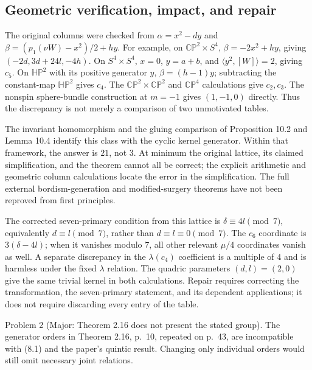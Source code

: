 \documentclass[10pt]{article}
\begin{document}
\subsection*{Geometric verification, impact, and repair}
The original columns were checked from \(\alpha=x^2-dy\) and \(\beta=(p_1(\nu W)-x^2)/2+hy\). For example, on \(\mathbb {CP}^2\times S^4\), \(\beta=-2x^2+hy\), giving \((-2d,3d+24l,-4h)\). On \(S^4\times S^4\), \(x=0\), \(y=a+b\), and \(\langle y^2,[W]\rangle=2\), giving \(c_5\). On \(\mathbb {HP}^2\) with its positive generator \(y\), \(\beta=(h-1)y\); subtracting the constant-map \(\mathbb {HP}^2\) gives \(c_4\). The \(\mathbb {CP}^2\times\mathbb {CP}^2\) and \(\mathbb {CP}^4\) calculations give \(c_2,c_3\). The nonspin sphere-bundle construction at \(m=-1\) gives \((1,-1,0)\) directly. Thus the discrepancy is not merely a comparison of two unmotivated tables.\par
The invariant homomorphism and the gluing comparison of Proposition 10.2 and Lemma 10.4 identify this class with the cyclic kernel generator. Within that framework, the answer is \(21\), not \(3\). At minimum the original lattice, its claimed simplification, and the theorem cannot all be correct; the explicit arithmetic and geometric column calculations locate the error in the simplification. The full external bordism-generation and modified-surgery theorems have not been reproved from first principles.\par
The corrected seven-primary condition from this lattice is \(\delta\equiv4l\pmod7\), equivalently \(d\equiv l\pmod7\), rather than \(d\equiv l\equiv0\pmod7\). The \(c_6\) coordinate is \(3(\delta-4l)\); when it vanishes modulo \(7\), all other relevant \(\mu/4\) coordinates vanish as well. A separate discrepancy in the \(\lambda(c_4)\) coefficient is a multiple of \(4\) and is harmless under the fixed \(\lambda\) relation. The quadric parameters \((d,l)=(2,0)\) give the same trivial kernel in both calculations. Repair requires correcting the transformation, the seven-primary statement, and its dependent applications; it does not require discarding every entry of the table.\par
Problem 2 (Major: Theorem 2.16 does not present the stated group).  The generator orders in Theorem 2.16, p. 10, repeated on p. 43, are incompatible with (8.1) and the paper’s quintic result. Changing only individual orders would still omit necessary joint relations.\par
\end{document}
